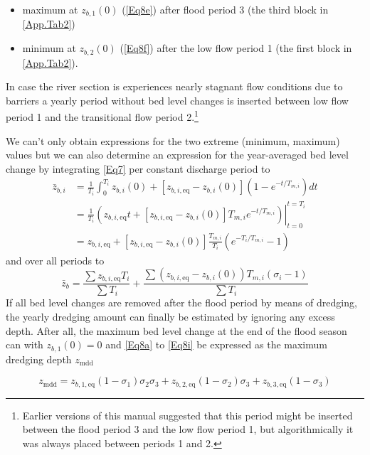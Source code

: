 \begin{itemize}
\item maximum at $z_{b,1}(0)$ (\autoref{Eq8e}) after flood period 3 (the third block in \autoref{App.Tab2})
\item minimum at $z_{b,2}(0)$ (\autoref{Eq8f}) after the low flow period 1 (the first block in \autoref{App.Tab2}).
\end{itemize}

In case the river section is experiences nearly stagnant flow conditions due to barriers a yearly period without bed level changes is inserted between low flow period 1 and the transitional flow period 2.\footnote{Earlier versions of this manual suggested that this period might be inserted between the flood period 3 and the low flow period 1, but algorithmically it was always placed between periods 1 and 2.}

We can't only obtain expressions for the two extreme (minimum, maximum) values but we can also determine an expression for the year-averaged bed level change by integrating \autoref{Eq7} per constant discharge period to
%
\begin{align}
\bar{z}_{b,i} &= \frac{1}{T_i} \int_0^{T_i}{z_{b,i} (0) + [z_{b,i,\text{eq}} - z_{b,i}(0)](1 - e^{-t/T_{m,i}})}dt \\
&= \frac{1}{T_i} \left . \left ( {z_{b,i,\text{eq}} t + [z_{b,i,\text{eq}} - z_{b,i}(0)]T_{m,i} e^{-t/T_{m,i}}} \right ) \right |_{t=0}^{t=T_i} \\
&= z_{b,i,\text{eq}} + [z_{b,i,\text{eq}} - z_{b,i}(0)] \frac{T_{m,i}}{T_i} ( e^{-T_i/T_{m,i}} - 1 )
\end{align}
%
and over all periods to
%
\begin{equation}
\bar{z}_b = \frac{\sum{z_{b,i,\text{eq}} T_i}}{\sum{T_i}} + \frac{\sum{(z_{b,i,\text{eq}}-z_{b,i}(0)) T_{m,i} (\sigma_i-1)}}{\sum{T_i}}
\label{Eq8h}
\end{equation}
%
If all bed level changes are removed after the flood period by means of dredging, the yearly dredging amount can finally be estimated by ignoring any excess depth.
After all, the maximum bed level change at the end of the flood season can with $z_{b,1}(0) = 0$ and \autoref{Eq8a} to \autoref{Eq8i} be expressed as the maximum dredging depth $z_\text{mdd}$

\begin{equation}
z_\text{mdd} = z_{b,1,\text{eq}}(1-\sigma_1) \sigma_2 \sigma_3 + z_{b,2,\text{eq}} (1-\sigma_2) \sigma_3 + z_{b,3,\text{eq}} (1-\sigma_3)
\label{Eq8i}
\end{equation}

